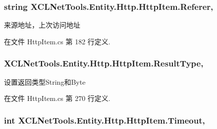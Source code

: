 \subsubsection[{\texorpdfstring{Referer}{Referer}}]{\setlength{\rightskip}{0pt plus 5cm}string X\+C\+L\+Net\+Tools.\+Entity.\+Http.\+Http\+Item.\+Referer\hspace{0.3cm}{\ttfamily [get]}, {\ttfamily [set]}}\hypertarget{class_x_c_l_net_tools_1_1_entity_1_1_http_1_1_http_item_a8fa227e3f6f7f0a925eb6cf2f1011ec3}{}\label{class_x_c_l_net_tools_1_1_entity_1_1_http_1_1_http_item_a8fa227e3f6f7f0a925eb6cf2f1011ec3}


来源地址，上次访问地址 



在文件 Http\+Item.\+cs 第 182 行定义.

\subsubsection[{\texorpdfstring{Result\+Type}{ResultType}}]{ X\+C\+L\+Net\+Tools.\+Entity.\+Http.\+Http\+Item.\+Result\+Type\hspace{0.3cm}{\ttfamily [get]}, {\ttfamily [set]}}\hypertarget{class_x_c_l_net_tools_1_1_entity_1_1_http_1_1_http_item_a92ebe05dc80b03bfdee04ec390dc4c8e}{}\label{class_x_c_l_net_tools_1_1_entity_1_1_http_1_1_http_item_a92ebe05dc80b03bfdee04ec390dc4c8e}


设置返回类型\+String和\+Byte 



在文件 Http\+Item.\+cs 第 270 行定义.

\subsubsection[{\texorpdfstring{Timeout}{Timeout}}]{\setlength{\rightskip}{0pt plus 5cm}int X\+C\+L\+Net\+Tools.\+Entity.\+Http.\+Http\+Item.\+Timeout\hspace{0.3cm}{\ttfamily [get]}, {\ttfamily [set]}}\hypertarget{class_x_c_l_net_tools_1_1_entity_1_1_http_1_1_http_item_a186cca2bc3a89d6385862bdf9cdcc70d}{}\label{class_x_c_l_net_tools_1_1_entity_1_1_http_1_1_http_item_a186cca2bc3a89d6385862bdf9cdcc70d}


